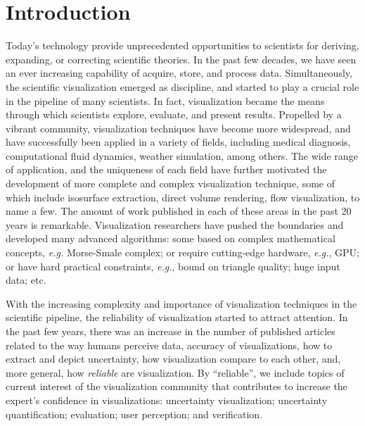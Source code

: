 \chapter{Introduction}

Today's technology provide unprecedented opportunities to scientists for deriving, expanding, or correcting scientific theories. In the past few decades, we  have seen an ever increasing capability of acquire, store, and process data. Simultaneously, the scientific visualization emerged as discipline, and started to play a crucial role in the pipeline of many scientists. In fact, visualization became the means through which scientists explore, evaluate, and present results. 
%
Propelled by a vibrant community, visualization techniques have become more widespread, and have successfully been applied in a variety of fields, including medical diagnosis, computational fluid dynamics, weather simulation, among others. The wide range of application, and the uniqueness of each field have further motivated the development of more complete and complex visualization technique, some of which include isosurface extraction, direct volume rendering, flow visualization, to name a few.  The amount of work published in each of these areas in the past 20 years is remarkable. Visualization researchers have pushed the boundaries and developed many advanced algorithms: some based on complex mathematical concepts, {\em e.g.} Morse-Smale complex; or require cutting-edge hardware, {\em e.g.}, GPU; or have hard practical constraints, {\em e.g.}, bound on triangle quality; huge input data; etc.

With the increasing complexity and importance of visualization techniques in the scientific pipeline, the reliability of visualization started to attract attention. In the past few years, there was an increase in the number of published articles related to the way humans perceive data, accuracy of visualizations, how to extract and depict uncertainty, how visualization compare to each other, and, more general, how \emph{reliable} are visualization.
%
By ``reliable'', we include topics of current interest of the visualization community that contributes to increase the expert's confidence in visualizations: uncertainty visualization; uncertainty quantification; evaluation; user perception; and verification.

